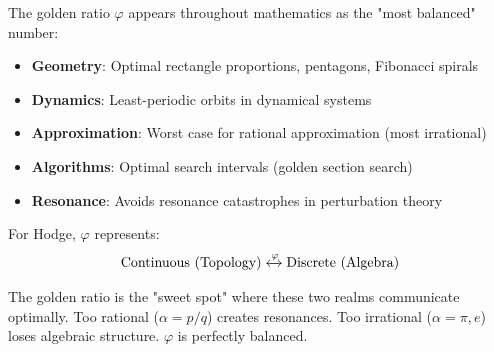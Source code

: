 \begin{level3}
The golden ratio $\varphi$ appears throughout mathematics as the "most balanced" number:

\begin{itemize}
\item \textbf{Geometry}: Optimal rectangle proportions, pentagons, Fibonacci spirals
\item \textbf{Dynamics}: Least-periodic orbits in dynamical systems
\item \textbf{Approximation}: Worst case for rational approximation (most irrational)
\item \textbf{Algorithms}: Optimal search intervals (golden section search)
\item \textbf{Resonance}: Avoids resonance catastrophes in perturbation theory
\end{itemize}

For Hodge, $\varphi$ represents:
\begin{equation}
\text{Continuous (Topology)} \xleftrightarrow{\varphi} \text{Discrete (Algebra)}
\end{equation}

The golden ratio is the "sweet spot" where these two realms communicate optimally. Too rational ($\alpha = p/q$) creates resonances. Too irrational ($\alpha = \pi, e$) loses algebraic structure. $\varphi$ is perfectly balanced.
\end{level3}


